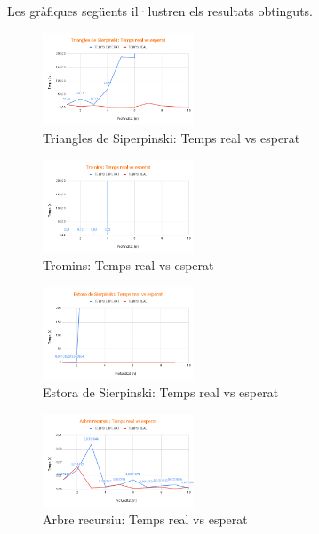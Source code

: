 \documentclass{ieeetj}
\begin{document}
Les gràfiques següents il·lustren els resultats obtinguts.
\begin{figure}[h]
\centerline{\includegraphics[width=0.4\textwidth]{docs/png/Triangles de Sierpinski_ Temps real vs esperat.png}}
\caption{Triangles de Siperpinski: Temps real vs esperat}
\label{fig:int2}
\end{figure}
\begin{figure}[H]
\centerline{\includegraphics[width=0.4\textwidth]{docs/png/Tromins_ Temps real vs esperat.png}}
\caption{Tromins: Temps real vs esperat}
\label{fig:int2}
\end{figure}
\begin{figure}[H]
\centerline{\includegraphics[width=0.4\textwidth]{docs/png/Estora de Sierpinski_ Temps real vs esperat.png}}
\caption{Estora de Sierpinski: Temps real vs esperat}
\label{fig:int2}
\end{figure}
\begin{figure}[H]
\centerline{\includegraphics[width=0.4\textwidth]{docs/png/Arbre recursiu_ Temps real vs esperat.png}}
\caption{Arbre recursiu: Temps real vs esperat}
\label{fig:int2}
\end{figure}
\end{document}
